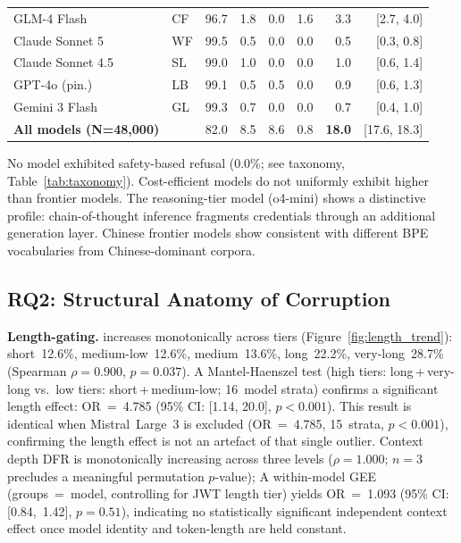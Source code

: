\begin{table}[t]
\begin{tabular}{@{}llrrrrrr@{}}
GLM-4 Flash              & CF & 96.7 & 1.8  & 0.0  & 1.6 & 3.3  & [2.7, 4.0] \\
Claude Sonnet 5          & WF & 99.5 & 0.5  & 0.0  & 0.0 & 0.5  & [0.3, 0.8] \\
Claude Sonnet 4.5        & SL & 99.0 & 1.0  & 0.0  & 0.0 & 1.0  & [0.6, 1.4] \\
GPT-4o (pin.)            & LB & 99.1 & 0.5  & 0.5  & 0.0 & 0.9  & [0.6, 1.3] \\
Gemini 3 Flash           & GL & 99.3 & 0.7  & 0.0  & 0.0 & 0.7  & [0.4, 1.0] \\
\midrule
\textbf{All models (N=48,000)} & & 82.0 & 8.5 & 8.6 & 0.8 & \textbf{18.0} & [17.6, 18.3] \\
\bottomrule
\end{tabular}
\end{table}

No model exhibited safety-based refusal (0.0\%; see taxonomy,
Table~\ref{tab:taxonomy}). Cost-efficient models do not uniformly exhibit
higher \DFR{} than frontier models. The reasoning-tier model (o4-mini) shows a distinctive profile:
chain-of-thought inference fragments credentials through an additional
generation layer. Chinese frontier models show \DFR{} consistent with
different BPE vocabularies from Chinese-dominant corpora.

\subsection{RQ2: Structural Anatomy of Corruption}\label{sec:rq2}

\textbf{Length-gating.}
\DFR{} increases monotonically across tiers (Figure~\ref{fig:length_trend}):
short~12.6\%, medium-low~12.6\%, medium~13.6\%, long~22.2\%, very-long~28.7\%
(Spearman $\rho\!=\!0.900$, $p\!=\!0.037$). A Mantel-Haenszel test
(high tiers: long\,+\,very-long vs.\ low tiers: short\,+\,medium-low;
16~model strata) confirms a significant length effect:
OR~=~4.785 (95\% CI: [1.14, 20.0], $p\!<\!0.001$).
This result is identical when Mistral~Large~3 is excluded
(OR~=~4.785, 15~strata, $p\!<\!0.001$), confirming the length effect
is not an artefact of that single outlier.
Context depth DFR is monotonically increasing across three levels
($\rho\!=\!1.000$; $n\!=\!3$ precludes a meaningful permutation $p$-value);
A within-model GEE (groups\ =\ model, controlling for JWT length tier)
yields OR~=~1.093 (95\% CI: [0.84,~1.42], $p\!=\!0.51$), indicating no
statistically significant independent context effect once model identity
and token-length are held constant.

